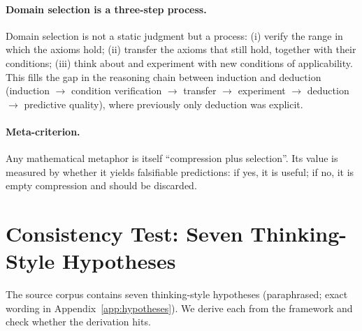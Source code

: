 \documentclass[11pt]{article}
\begin{document}
\paragraph{Domain selection is a three-step process.}
Domain selection is not a static judgment but a process: (i) verify the range in
which the axioms hold; (ii) transfer the axioms that still hold, together with
their conditions; (iii) think about and experiment with new conditions of
applicability. This fills the gap in the reasoning chain between induction and
deduction (induction $\to$ condition verification $\to$ transfer $\to$
experiment $\to$ deduction $\to$ predictive quality), where previously only
deduction was explicit.

\paragraph{Meta-criterion.}
Any mathematical metaphor is itself ``compression plus selection''. Its value is
measured by whether it yields falsifiable predictions: if yes, it is useful; if
no, it is empty compression and should be discarded.
\section{Consistency Test: Seven Thinking-Style Hypotheses}
\label{sec:consistency}

The source corpus contains seven thinking-style hypotheses (paraphrased; exact
wording in Appendix~\ref{app:hypotheses}). We derive each from the framework and
check whether the derivation hits.
\end{document}
